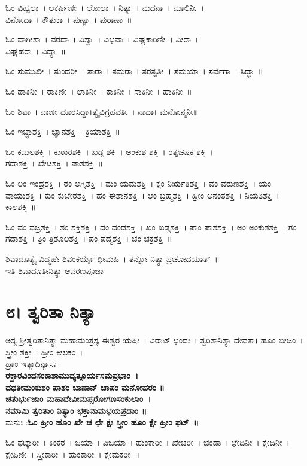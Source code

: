 ಓಂ ವಿಹ್ವಲಾ~।  ಆಕರ್ಷಿಣೀ~।  ಲೋಲಾ~।  ನಿತ್ಯಾ~।  ಮದನಾ~।  ಮಾಲಿನೀ~। \\ವಿನೋದಾ~।  ಕೌತುಕಾ~।  ಪುಣ್ಯಾ~।  ಪುರಾಣಾ~॥ 

ಓಂ ವಾಗೀಶಾ~।  ವರದಾ~।  ವಿಶ್ವಾ~।  ವಿಭವಾ~।  ವಿಘ್ನಕಾರಿಣೀ~।  ವೀರಾ~। \\ವಿಘ್ನಹರಾ~।  ವಿದ್ಯಾ~॥ 

ಓಂ ಸುಮುಖೀ~।  ಸುಂದರೀ~।  ಸಾರಾ~।  ಸಮರಾ~।  ಸರಸ್ವತೀ~।  ಸಮಯಾ~।  ಸರ್ವಗಾ~।  ಸಿದ್ಧಾ~॥ 

ಓಂ ಡಾಕಿನೀ~।  ರಾಕಿಣೀ~।  ಲಾಕಿನೀ~।  ಕಾಕಿನೀ~।  ಸಾಕಿನೀ~।  ಹಾಕಿನೀ~॥ 

ಓಂ ಶಿವಾ~। ವಾಣೀ।ದೂರಸಿದ್ಧಾ।ತ್ಯೈವಿಗ್ರಹವತೀ~। ನಾದಾ।  ಮನೋನ್ಮನೀ॥ 

ಓಂ ಇಚ್ಛಾಶಕ್ತಿ~।  ಜ್ಞಾನಶಕ್ತಿ~।  ಕ್ರಿಯಾಶಕ್ತಿ~॥ 

ಓಂ ಕಮಲಶಕ್ತಿ~।  ಕುಠಾರಶಕ್ತಿ~।  ಖಡ್ಗ ಶಕ್ತಿ~।  ಅಂಕುಶ ಶಕ್ತಿ~।  ರತ್ನಚಷಕ ಶಕ್ತಿ~।\\ಗದಾಶಕ್ತಿ~।  ಖೇಟಶಕ್ತಿ~।  ಪಾಶಶಕ್ತಿ~॥ 

ಓಂ ಲಂ ಇಂದ್ರಶಕ್ತಿ~।  ರಂ ಅಗ್ನಿಶಕ್ತಿ~।  ಮಂ ಯಮಶಕ್ತಿ~।  ಕ್ಷಂ ನಿರ್ಋತಿಶಕ್ತಿ~।  ವಂ ವರುಣಶಕ್ತಿ~।  ಯಂ ವಾಯುಶಕ್ತಿ~।  ಕುಂ ಕುಬೇರಶಕ್ತಿ~।  ಹಂ ಈಶಾನಶಕ್ತಿ~।  ಆಂ ಬ್ರಹ್ಮಶಕ್ತಿ~।  ಹ್ರೀಂ ಅನಂತಶಕ್ತಿ~।  ನಿಯತಿಶಕ್ತಿ~।  ಕಾಲಶಕ್ತಿ~॥

ಓಂ ವಂ ವಜ್ರಶಕ್ತಿ~।  ಶಂ ಶಕ್ತಿಶಕ್ತಿ~।  ದಂ ದಂಡಶಕ್ತಿ~।  ಖಂ ಖಡ್ಗಶಕ್ತಿ~।  ಪಾಂ ಪಾಶಶಕ್ತಿ~।  ಅಂ ಅಂಕುಶಶಕ್ತಿ~।  ಗಂ ಗದಾಶಕ್ತಿ~।  ತ್ರಿಂ ತ್ರಿಶೂಲಶಕ್ತಿ~।  ಪಂ ಪದ್ಮಶಕ್ತಿ~।  ಚಂ ಚಕ್ರಶಕ್ತಿ~॥ 

ಶಿವಾದೂತ್ಯೈ ವಿದ್ಮಹೇ ಶಿವಂಕರ್ಯೈ ಧೀಮಹಿ~। ತನ್ನೋ ನಿತ್ಯಾ ಪ್ರಚೋದಯಾತ್~॥\\
ಇತಿ ಶಿವಾದೂತೀನಿತ್ಯಾ ಆವರಣಪೂಜಾ
\section{೮। ತ್ವರಿತಾ ನಿತ್ಯಾ}
ಅಸ್ಯ ಶ್ರೀತ್ವರಿತಾನಿತ್ಯಾ ಮಹಾಮಂತ್ರಸ್ಯ ಈಶ್ವರ ಋಷಿಃ~। ವಿರಾಟ್ ಛಂದಃ~। ತ್ವರಿತಾನಿತ್ಯಾ ದೇವತಾ। ಹೂಂ ಬೀಜಂ~। ಸ್ತ್ರೀಂ ಶಕ್ತಿಃ~। ಹ್ರೀಂ ಕೀಲಕಂ~।\\
ಹ್ರಾಂ ಇತ್ಯಾದಿನ್ಯಾಸಃ ।\\
{\bfseries ರಕ್ತಾರವಿಂದಸಂಕಾಶಾಮುದ್ಯತ್ಸೂರ್ಯಸಮಪ್ರಭಾಂ~।\\
ದಧತೀಮಂಕುಶಂ ಪಾಶಂ ಬಾಣಾನ್ ಚಾಪಂ ಮನೋಹರಂ ॥\\
ಚತುರ್ಭುಜಾಂ ಮಹಾದೇವೀಮಪ್ಸರೋಗಣಸಂಕುಲಾಂ~।\\
ನಮಾಮಿ ತ್ವರಿತಾಂ ನಿತ್ಯಾಂ ಭಕ್ತಾನಾಮಭಯಪ್ರದಾಂ ॥\\}
ಮನುಃ :{\bfseries  ಓಂ ಹ್ರೀಂ ಹೂಂ ಖೇ ಚ ಛೇ ಕ್ಷಃ ಸ್ತ್ರೀಂ ಹೂಂ ಕ್ಷೇ ಹ್ರೀಂ ಫಟ್~॥}

ಓಂ ಫಟ್ಕಾರೀ~। ಕಿಂಕರ~। ಜಯಾ~। ವಿಜಯಾ~। ಹುಂಕಾರೀ~। ಖೇಚರೀ~। ಚಂಡಾ~। ಛೇದಿನೀ~। ಕ್ಷೇದಿನೀ~। ಕ್ಷೇಪಿಣೀ~। ಸ್ತ್ರೀಕಾರೀ~। ಹುಂಕಾರೀ~। ಕ್ಷೇಮಕರೀ~॥

